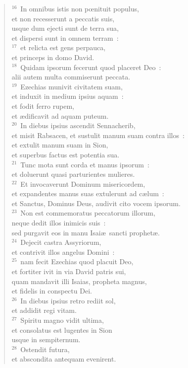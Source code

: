 \begin{flushleft}\begin{verse}${}^{16}$~In omnibus istis non pœnituit populus,\\ et non recesserunt a peccatis suis,\\ usque dum ejecti sunt de terra sua,\\ et dispersi sunt in omnem terram~:\\
${}^{17}$~et relicta est gens perpauca,\\ et princeps in domo David.\\
${}^{18}$~Quidam ipsorum fecerunt quod placeret Deo~:\\ alii autem multa commiserunt peccata.\\
${}^{19}$~Ezechias munivit civitatem suam,\\ et induxit in medium ipsius aquam~:\\ et fodit ferro rupem,\\ et \ae dificavit ad aquam puteum.\\
${}^{20}$~In diebus ipsius ascendit Sennacherib,\\ et misit Rabsacen, et sustulit manum suam contra illos~:\\ et extulit manum suam in Sion,\\ et superbus factus est potentia sua.\\
${}^{21}$~Tunc mota sunt corda et manus ipsorum~:\\ et doluerunt quasi parturientes mulieres.\\
${}^{22}$~Et invocaverunt Dominum misericordem,\\ et expandentes manus suas extulerunt ad c\ae lum~:\\ et Sanctus, Dominus Deus, audivit cito vocem ipsorum.\\
${}^{23}$~Non est commemoratus peccatorum illorum,\\ neque dedit illos inimicis suis~:\\ sed purgavit eos in manu Isai\ae\ sancti prophet\ae .\\
${}^{24}$~Dejecit castra Assyriorum,\\ et contrivit illos angelus Domini~:\\
${}^{25}$~nam fecit Ezechias quod placuit Deo,\\ et fortiter ivit in via David patris sui,\\ quam mandavit illi Isaias, propheta magnus,\\ et fidelis in conspectu Dei.\\
${}^{26}$~In diebus ipsius retro rediit sol,\\ et addidit regi vitam.\\
${}^{27}$~Spiritu magno vidit ultima,\\ et consolatus est lugentes in Sion\\ usque in sempiternum.\\
${}^{28}$~Ostendit futura,\\ et abscondita antequam evenirent.\end{verse}\end{flushleft}


